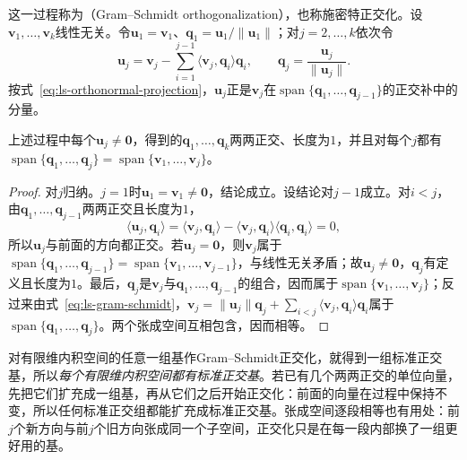 这一过程称为（Gram--Schmidt orthogonalization），也称施密特正交化。设$\bm v_1,\ldots,\bm v_k$线性无关。令$\bm u_1=\bm v_1$、$\bm q_1=\bm u_1/\lVert\bm u_1\rVert$；对$j=2,\ldots,k$依次令
\begin{equation}
 \bm u_j=\bm v_j-\sum_{i=1}^{j-1}\langle\bm v_j,\bm q_i\rangle\bm q_i,
 \qquad
 \bm q_j=\frac{\bm u_j}{\lVert\bm u_j\rVert}.
 \label{eq:ls-gram-schmidt}
\end{equation}
按式~\eqref{eq:ls-orthonormal-projection}，$\bm u_j$正是$\bm v_j$在$\operatorname{span}\{\bm q_1,\ldots,\bm q_{j-1}\}$的正交补中的分量。
\begin{theorem}
\label{thm:ls-gram-schmidt}
上述过程中每个$\bm u_j\neq\bm0$，得到的$\bm q_1,\ldots,\bm q_k$两两正交、长度为$1$，并且对每个$j$都有$\operatorname{span}\{\bm q_1,\ldots,\bm q_j\}=\operatorname{span}\{\bm v_1,\ldots,\bm v_j\}$。
\end{theorem}
\begin{proof}
对$j$归纳。$j=1$时$\bm u_1=\bm v_1\neq\bm0$，结论成立。设结论对$j-1$成立。对$i<j$，由$\bm q_1,\ldots,\bm q_{j-1}$两两正交且长度为$1$，
\[
 \langle\bm u_j,\bm q_i\rangle=\langle\bm v_j,\bm q_i\rangle-\langle\bm v_j,\bm q_i\rangle\langle\bm q_i,\bm q_i\rangle=0,
\]
所以$\bm u_j$与前面的方向都正交。若$\bm u_j=\bm0$，则$\bm v_j$属于$\operatorname{span}\{\bm q_1,\ldots,\bm q_{j-1}\}=\operatorname{span}\{\bm v_1,\ldots,\bm v_{j-1}\}$，与线性无关矛盾；故$\bm u_j\neq\bm0$，$\bm q_j$有定义且长度为$1$。最后，$\bm q_j$是$\bm v_j$与$\bm q_1,\ldots,\bm q_{j-1}$的组合，因而属于$\operatorname{span}\{\bm v_1,\ldots,\bm v_j\}$；反过来由式~\eqref{eq:ls-gram-schmidt}，$\bm v_j=\lVert\bm u_j\rVert\bm q_j+\sum_{i<j}\langle\bm v_j,\bm q_i\rangle\bm q_i$属于$\operatorname{span}\{\bm q_1,\ldots,\bm q_j\}$。两个张成空间互相包含，因而相等。
\end{proof}
对有限维内积空间的任意一组基作Gram--Schmidt正交化，就得到一组标准正交基，所以\emph{每个有限维内积空间都有标准正交基}。若已有几个两两正交的单位向量，先把它们扩充成一组基，再从它们之后开始正交化：前面的向量在过程中保持不变，所以任何标准正交组都能扩充成标准正交基。张成空间逐段相等也有用处：前$j$个新方向与前$j$个旧方向张成同一个子空间，正交化只是在每一段内部换了一组更好用的基。

